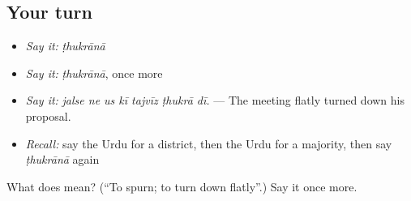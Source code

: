 \subsection*{Your turn}
\begin{itemize}
\raggedright
  \item \emph{Say it:} \emph{ṭhukrānā}
  \item \emph{Say it:} \emph{ṭhukrānā}, once more
  \item \emph{Say it:} \emph{jalse ne us kī tajvīz ṭhukrā dī.} — The meeting flatly turned down his proposal.
  \item \emph{Recall:} say the Urdu for a district, then the Urdu for a majority, then say \emph{ṭhukrānā} again
\end{itemize}

\begin{tcolorbox}[breakable,colback=teal!4,colframe=teal!35!black,title={Before you move on}]
What does  mean? (\textquotedblleft{}To spurn; to turn down flatly\textquotedblright{}.) Say it once more.
\end{tcolorbox}
